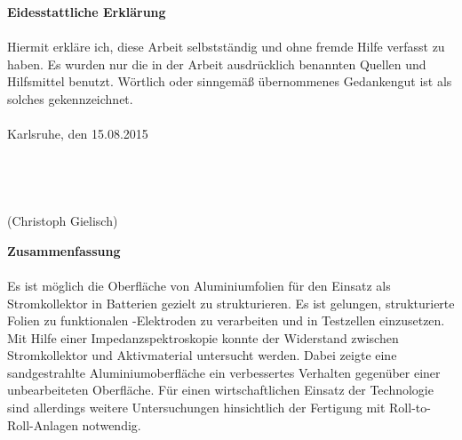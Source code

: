 \documentclass[a4paper, 11pt, headsepline,footsepline,twoside,abstract]{scrbook}
\begin{document}
\cleardoubleemptypage
\setcounter{page}{1}
\textbf{\Large{Eidesstattliche Erklärung}}
\\\\
Hiermit erkläre ich, diese Arbeit selbstständig und ohne fremde Hilfe verfasst zu haben. Es wurden nur die in der Arbeit ausdrücklich benannten Quellen und Hilfsmittel benutzt. Wörtlich oder sinngemäß übernommenes Gedankengut ist als solches gekennzeichnet.
\\\\
Karlsruhe, den 15.08.2015
\\\\
\\\\
\\
(Christoph Gielisch) 
 
\newpage

\setcounter{page}{1}
\textbf{\Large{Zusammenfassung}}
\\\\
Es ist möglich die Oberfläche von Aluminiumfolien für den Einsatz als Stromkollektor in Batterien gezielt zu strukturieren. Es ist gelungen, strukturierte Folien zu funktionalen -Elektroden zu verarbeiten und in Testzellen einzusetzen. Mit Hilfe einer Impedanzspektroskopie konnte der Widerstand zwischen Stromkollektor und Aktivmaterial untersucht werden. Dabei zeigte eine sandgestrahlte Aluminiumoberfläche ein verbessertes Verhalten gegenüber einer unbearbeiteten Oberfläche. Für einen wirtschaftlichen Einsatz der Technologie sind allerdings weitere Untersuchungen hinsichtlich der Fertigung mit Roll-to-Roll-Anlagen notwendig.
\pagestyle{toc}
\renewcommand*{\chapterpagestyle}{toc} %
\tableofcontents
{} 
\newpage
\cleardoubleemptypage
\pagestyle{normal}
\renewcommand*{\chapterpagestyle}{plain}
\setcounter{page}{1}
\end{document}
